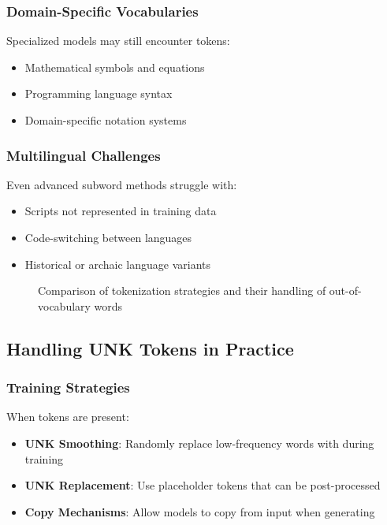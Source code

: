 \subsubsection{Domain-Specific Vocabularies}
Specialized models may still encounter \unk{} tokens:
\begin{itemize}
\item Mathematical symbols and equations
\item Programming language syntax
\item Domain-specific notation systems
\end{itemize}

\subsubsection{Multilingual Challenges}
Even advanced subword methods struggle with:
\begin{itemize}
\item Scripts not represented in training data
\item Code-switching between languages
\item Historical or archaic language variants
\end{itemize}

\begin{figure}[h]
\centering
% 
\caption{Comparison of tokenization strategies and their handling of out-of-vocabulary words}
\end{figure}

\subsection{Handling UNK Tokens in Practice}

\subsubsection{Training Strategies}
When \unk{} tokens are present:

\begin{itemize}
\item \textbf{UNK Smoothing}: Randomly replace low-frequency words with \unk{} during training
\item \textbf{UNK Replacement}: Use placeholder tokens that can be post-processed
\item \textbf{Copy Mechanisms}: Allow models to copy from input when generating \unk{}
\end{itemize}

